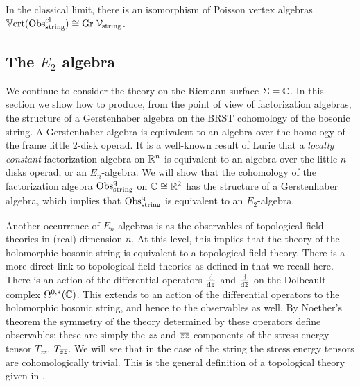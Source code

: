 \begin{cor} In the classical limit, there is an isomorphism of Poisson vertex algebras~$\mathbb{V}{\rm ert}({\rm Obs}^{{\rm cl}}_{\rm string}) \cong {\rm Gr} \; \mathcal{V}_{\rm string}$.
\end{cor}



\subsection{The $E_2$ algebra}

We continue to consider the theory on the Riemann surface $\Sigma = \mathbb C$. 
In this section we show how to produce, from the point of view of factorization algebras, the structure of a Gerstenhaber algebra on the BRST cohomology of the bosonic string. 
A Gerstenhaber algebra is equivalent to an algebra over the homology of the frame little 2-disk operad. 
It is a well-known result of Lurie \cite{Lurie} that a {\em locally constant} factorization algebra on $\mathbb R^n$ is equivalent to an algebra over the little $n$-disks operad, or an $E_n$-algebra. 
We will show that the cohomology of the factorization algebra ${\rm Obs}^{{\rm q}}_{\rm string}$ on $\mathbb C \cong \mathbb R^2$ has the structure of a Gerstenhaber algebra, which implies that ${\rm Obs}^{\rm q}_{\rm string}$ is equivalent to an $E_2$-algebra. 

Another occurrence of $E_n$-algebras is as the observables of topological field theories in (real) dimension $n$. 
At this level, this implies that the theory of the holomorphic bosonic string is equivalent to a topological field theory. There is a more direct link to topological field theories as defined in \cite{wtop} that we recall here. 
There is an action of the differential operators $\frac{{\rm d}}{{\rm d} z}$ and $\frac{{\rm d}}{{\rm d} \overline{z}}$ on the Dolbeault complex $\Omega^{0,*}(\mathbb C)$. 
This extends to an action of the differential operators to the holomorphic bosonic string, and hence to the observables as well. 
By Noether's theorem the symmetry of the theory determined by these operators define observables: these are simply the $zz$ and $\overline{z} \overline{z}$ components of the stress energy tensor $T_{zz}$, $T_{\overline{z} \overline{z}}$. 
We will see that in the case of the string the stress energy tensors are cohomologically trivial. 
This is the general definition of a topological theory given in \cite{top}.


